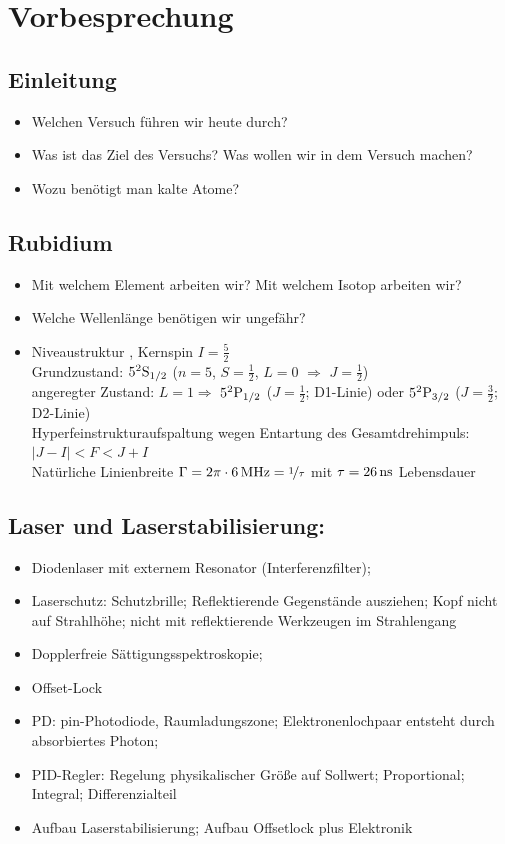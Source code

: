 \documentclass[10pt,a4paper]{extarticle}
\begin{document}
\section*{Vorbesprechung}

\subsection*{Einleitung}
\begin{itemize}
\item Welchen Versuch führen wir heute durch?
\item Was ist das Ziel des Versuchs? Was wollen wir in dem Versuch machen?
\item Wozu benötigt man kalte Atome?
\end{itemize}

\subsection*{Rubidium}
\begin{itemize}
\item Mit welchem Element arbeiten wir? Mit welchem Isotop arbeiten wir? 
\item Welche Wellenlänge benötigen wir ungefähr? 
\item Niveaustruktur , Kernspin $I=\frac{5}{2}$ \\ 
Grundzustand: $5^2\rm{S}_{1/2}$ ($n=5$, $S=\frac{1}{2}$, $L=0$ $\Rightarrow$ $J=\frac{1}{2}$) \\
angeregter Zustand: $L=1 \Rightarrow$ $5^2\rm{P}_{1/2}$ ($J=\frac{1}{2}$; D1-Linie) oder $5^2\rm{P}_{3/2}$ ($J=\frac{3}{2}$; D2-Linie) \\
Hyperfeinstrukturaufspaltung wegen Entartung des Gesamtdrehimpuls: $|J-I|<F<J+I$ \\
Natürliche Linienbreite  $\Gamma=2\pi\cdot\unit[6]{MHz} =\nicefrac{1}{\tau}$ mit  $\tau=\unit[26]{ns}$ Lebensdauer
\end{itemize}

\subsection*{Laser und Laserstabilisierung:}
\begin{itemize}
\item Diodenlaser mit externem Resonator (Interferenzfilter);
\item Laserschutz: Schutzbrille; Reflektierende Gegenstände ausziehen; Kopf nicht auf Strahlhöhe; nicht mit reflektierende Werkzeugen im Strahlengang
\item Dopplerfreie Sättigungsspektroskopie;
\item Offset-Lock
\item PD: pin-Photodiode, Raumladungszone; Elektronenlochpaar entsteht durch absorbiertes Photon;
\item PID-Regler: Regelung physikalischer Größe auf Sollwert; Proportional; Integral; Differenzialteil
\item Aufbau Laserstabilisierung; Aufbau Offsetlock plus Elektronik
\end{itemize}
\end{document}
